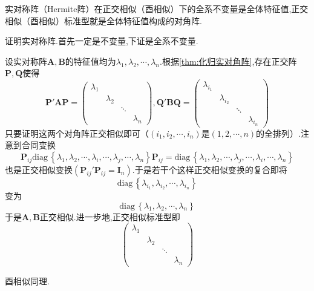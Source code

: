 \begin{green}
    \begin{corollary}[正交相似和酉相似的全系不变量]\label{cor:正交相似和酉相似的全系不变量}
        实对称阵（\textup{Hermite}阵）在正交相似（酉相似）下的全系不变量是全体特征值,正交相似（酉相似）标准型就是全体特征值构成的对角阵.
    \end{corollary}
    \begin{Proof}
        证明实对称阵.首先一定是不变量,下证是全系不变量.

        设实对称阵$\bm{A},\bm{B}$的特征值均为$\lambda_1,\lambda_2,\cdots,\lambda_n$.根据\cref{thm:化归实对角阵},存在正交阵$\bm{P},\bm{Q}$使得\[
        \bm{P}'\bm{AP}=\begin{pmatrix}
            \lambda_1&&&\\
            &\lambda_2&&\\
            &&\ddots&\\
            &&&\lambda_n
        \end{pmatrix},\bm{Q}'\bm{BQ}=\begin{pmatrix}
            \lambda_{i_1}&&&\\
            &\lambda_{i_2}&&\\
            &&\ddots&\\
            &&&\lambda_{i_n}
        \end{pmatrix}
        \]只要证明这两个对角阵正交相似即可（$\left(i_1,i_2,\cdots,i_n\right)$是$\left(1,2,\cdots,n\right)$的全排列）.注意到合同变换\[
        \bm{P}_{ij}\mathrm{diag}\,\left\{
            \lambda_1,\lambda_2,\cdots,\lambda_i,\cdots,\lambda_j,\cdots,\lambda_n
        \right\}\bm{P}_{ij}= \mathrm{diag}\,\left\{
            \lambda_1,\lambda_2,\cdots,\lambda_j,\cdots,\lambda_i,\cdots,\lambda_n
        \right\}
        \]也是正交相似变换$\left(\bm{P}_{ij}'\bm{P}_{ij}=\bm{I}_n\right)$.于是若干个这样正交相似变换的复合即将\[\mathrm{diag}\,\left\{
            \lambda_{i_1},\lambda_{i_2},\cdots,\lambda_{i_n}
        \right\}\]变为\[\mathrm{diag}\,\left\{
            \lambda_1,\lambda_2,\cdots,\lambda_n
        \right\}\]于是$\bm{A},\bm{B}$正交相似.进一步地,正交相似标准型即\[
        \begin{pmatrix}
            \lambda_1&&&\\
            &\lambda_2&&\\
            &&\ddots&\\
            &&&\lambda_n
        \end{pmatrix}
        \]
        
        酉相似同理.
    \end{Proof}
\end{green}

